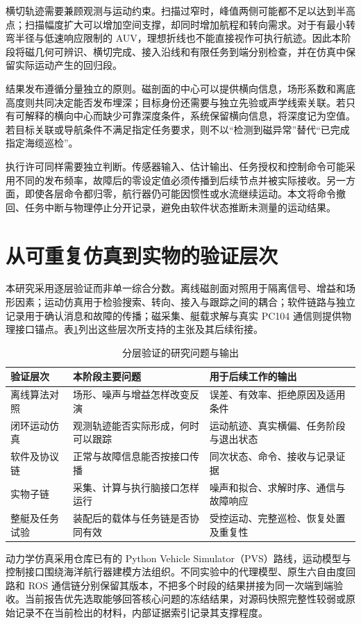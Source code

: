 横切轨迹需要兼顾观测与运动约束。扫描过窄时，峰值两侧可能都不足以达到半高点；扫描幅度扩大可以增加空间支撑，却同时增加航程和转向需求。对于有最小转弯半径与低速响应限制的 AUV，理想折线也不能直接视作可执行航迹。因此本阶段将磁几何可辨识、横切完成、接入沿线和有限任务到端分别检查，并在仿真中保留实际运动产生的回归段。

结果发布遵循分量独立的原则。磁剖面的中心可以提供横向信息，场形系数和离底高度则共同决定能否发布埋深；目标身份还需要与独立先验或声学线索关联。若只有可解释的横向中心而缺少可靠深度条件，系统保留横向信息，将深度记为空值。若目标关联或导航条件不满足指定任务要求，则不以“检测到磁异常”替代“已完成指定海缆巡检”。

执行许可同样需要独立判断。传感器输入、估计输出、任务授权和控制命令可能采用不同的发布频率，故障后的零设定值必须传播到后续节点并被实际接收。另一方面，即使各层命令都归零，航行器仍可能因惯性或水流继续运动。本文将命令撤回、任务中断与物理停止分开记录，避免由软件状态推断未测量的运动结果。

\section{从可重复仿真到实物的验证层次}

本研究采用逐层验证而非单一综合分数。离线磁剖面对照用于隔离信号、增益和场形因素；运动仿真用于检验搜索、转向、接入与跟踪之间的耦合；软件链路与独立记录用于确认消息和故障的传播；磁采集、艇载求解与真实 PC104 通信则提供物理接口锚点。表\ref{tab:middle-evidence-layers}列出这些层次所支持的主张及其后续衔接。

\begin{table}[htbp]
\centering\caption{分层验证的研究问题与输出}\label{tab:middle-evidence-layers}
\begin{tabularx}{\linewidth}{p{2.3cm}XX}\toprule
验证层次&本阶段主要问题&用于后续工作的输出\\\midrule
离线算法对照&场形、噪声与增益怎样改变反演&误差、有效率、拒绝原因及适用条件\\
闭环运动仿真&观测轨迹能否实际形成，何时可以跟踪&运动航迹、真实横偏、任务阶段与退出状态\\
软件及协议链&正常与故障信息能否按接口传播&同次状态、命令、接收与记录证据\\
实物子链&采集、计算与执行脑接口怎样运行&噪声和拟合、求解时序、通信与故障响应\\
整艇及任务试验&装配后的载体与任务链是否协同有效&受控运动、完整巡检、恢复处置及重复性\\\bottomrule
\end{tabularx}
\end{table}

动力学仿真采用仓库已有的 Python Vehicle Simulator（PVS）路线，运动模型与控制接口围绕海洋航行器建模方法组织\cite{fossen2011handbook}。不同实验中的代理模型、原生六自由度回路和 ROS 通信链分别保留其版本，不把多个时段的结果拼接为同一次端到端验收。当前报告优先选取能够回答核心问题的冻结结果，对源码快照完整性较弱或原始记录不在当前检出的材料，内部证据索引记录其支撑程度。
